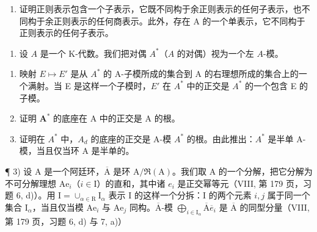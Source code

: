 \begin{enumerate}
\def\labelenumi{\alph{enumi})}
\setcounter{enumi}{1}
\tightlist
\item
  证明正则表示包含一个子表示，它既不同构于余正则表示的任何子表示，也不同构于余正则表示的任何商表示。此外，存在 A 的一个单表示，它不同构于正则表示的任何子表示。
\end{enumerate}

\begin{enumerate}
\def\labelenumi{\arabic{enumi})}
\setcounter{enumi}{1}
\tightlist
\item
  设 \(A\) 是一个 K-代数。我们把对偶 \(A^*\)（\(A\) 的对偶）视为一个左 \(A\)-模。
\end{enumerate}

\begin{enumerate}
\def\labelenumi{\alph{enumi})}
\item
  映射 \(E \mapsto E'\) 是从 \(A^{*}\) 的 A-子模所成的集合到 A 的右理想所成的集合上的一个满射。当 E 是这样一个子模时，\(E'\) 在 \(A^{*}\) 中的正交是 \(A^{*}\) 的一个包含 E 的子模。
\item
  证明 \(\mathbf{A}^*\) 的底座在 A 中的正交是 A 的根。
\item
  证明在 \(A^{*}\) 中，\(A_{d}\) 的底座的正交是 A-模 \(A^{*}\) 的根。由此推出：\(A^{*}\) 是半单 A-模，当且仅当环 A 是半单的。
\end{enumerate}

¶ 3) 设 A 是一个阿廷环，\(\overline{\mathrm{A}}\) 是环 \(\mathrm{A} / \Re (\mathrm{A})\)。我们取 A 的一个分解，把它分解为不可分解理想 \(\mathrm{Ae}_i\)（\(i\in \mathrm{I}\)）的直和，其中诸 \(e_i\) 是正交幂等元（VIII, 第 179 页，习题 6, d)）。用 \(\mathrm{I} = \cup_{\alpha \in \mathrm{R}}\mathrm{I}_{\alpha}\) 表示 I 的这样一个分拆：I 的两个元素 \(i,j\) 属于同一个集合 \(\mathrm{I}_{\alpha}\)，当且仅当模 \(\mathrm{Ae}_i\) 与 \(\mathrm{Ae}_j\) 同构。\(\overline{\mathrm{A}}\)-模 \(\bigoplus_{i\in \mathrm{I}_{\alpha}}\overline{\mathrm{A}}\overline{e}_i\) 是 \(\overline{\mathrm{A}}\) 的同型分量（VIII, 第 179 页，习题 6, d) 与 7, a)）

